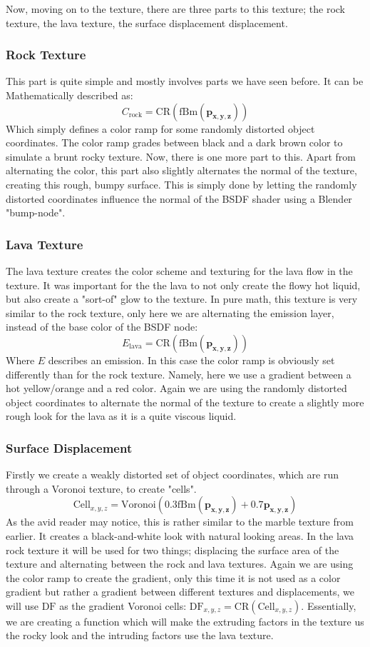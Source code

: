 \documentclass[a4paper, 12pt]{olplainarticle}
\begin{document}
Now, moving on to the texture, there are three parts to this texture; the rock texture, the lava texture, the surface displacement displacement.

\subsubsection{Rock Texture}
This part is quite simple and mostly involves parts we have seen before. It can be Mathematically described as:
$$
    C_{\text{rock}} = \text{CR}(\text{fBm}(\mathbf{p_{x,y,z}}))
$$
Which simply defines a color ramp for some randomly distorted object coordinates. The color ramp grades between black and a dark brown color to simulate a brunt rocky texture.
Now, there is one more part to this. Apart from alternating the color, this part also slightly alternates the normal of the texture, creating this rough, bumpy surface.
This is simply done by letting the randomly distorted coordinates influence the normal of the BSDF shader using a Blender "bump-node".

\subsubsection{Lava Texture}
The lava texture creates the color scheme and texturing for the lava flow in the texture. It was important for the the lava to not only create the flowy hot liquid, but also create a "sort-of" glow to the texture.
In pure math, this texture is very similar to the rock texture, only here we are alternating the emission layer, instead of the base color of the BSDF node:
$$
    E_{\text{lava}} = \text{CR}(\text{fBm}(\mathbf{p_{x,y,z}}))
$$
Where $E$ describes an emission. In this case the color ramp is obviously set differently than for the rock texture. 
Namely, here we use a gradient between a hot yellow/orange and a red color.
Again we are using the randomly distorted object coordinates to alternate the normal of the texture to create a slightly more rough look for the lava as it is a quite viscous liquid.

\subsubsection{Surface Displacement}
Firstly we create a weakly distorted set of object coordinates, which are run through a Voronoi texture, to create "cells".
$$
    \text{Cell}_{x,y,z} = \text{Voronoi}(0.3 \text{fBm}(\mathbf{p_{x,y,z}}) + 0.7  \mathbf{p_{x,y,z}})
$$
As the avid reader may notice, this is rather similar to the marble texture from earlier. It creates a black-and-white look with natural looking areas. 
In the lava rock texture it will be used for two things; displacing the surface area of the texture and alternating between the rock and lava textures.
Again we are using the color ramp to create the gradient, only this time it is not used as a color gradient but rather a gradient between different textures and displacements, we will use $\text{DF}$ as the gradient Voronoi cells: $\text{DF}_{x,y,z} = \text{CR}(\text{Cell}_{x,y,z})$.
Essentially, we are creating a function which will make the extruding factors in the texture us the rocky look and the intruding factors use the lava texture.
\end{document}
